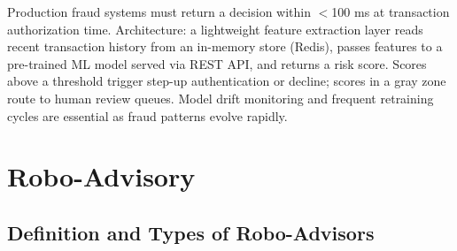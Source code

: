 \begin{tcbitemize}[ skin=sectionraster ]
    \tcbitem[title=Real-Time Fraud Scoring, raster multicolumn=3]
    Production fraud systems must return a decision within $<$100 ms at transaction authorization time.
    Architecture: a lightweight feature extraction layer reads recent transaction history from an in-memory store (Redis), passes features to a pre-trained ML model served via REST API, and returns a risk score.
    Scores above a threshold trigger step-up authentication or decline; scores in a gray zone route to human review queues.
    Model drift monitoring and frequent retraining cycles are essential as fraud patterns evolve rapidly.

\end{tcbitemize}

\section{Robo-Advisory}

\subsection{Definition and Types of Robo-Advisors}


